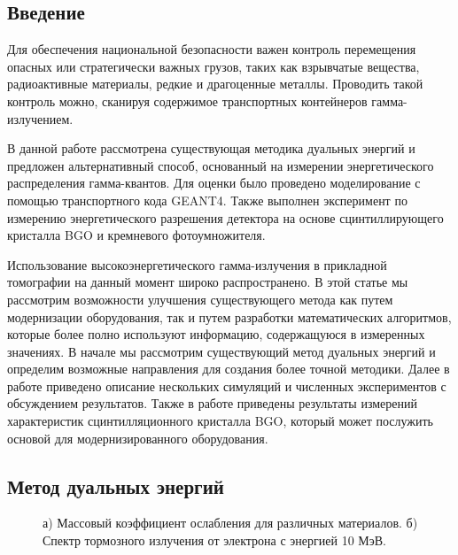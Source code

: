 
\subsection{Введение}

Для обеспечения национальной безопасности важен контроль перемещения опасных или стратегически важных грузов, таких как взрывчатые вещества, радиоактивные материалы, редкие и драгоценные металлы. Проводить такой контроль можно, сканируя содержимое транспортных контейнеров гамма-излучением.

В данной работе рассмотрена существующая методика дуальных энергий и предложен альтернативный способ, основанный на измерении энергетического распределения гамма-квантов. Для оценки было проведено моделирование с помощью транспортного кода GEANT4.  Также выполнен эксперимент по измерению энергетического разрешения детектора на основе сцинтиллирующего кристалла BGO и кремневого фотоумножителя.

Использование высокоэнергетического гамма-излучения в прикладной томографии на данный момент широко распространено.  В этой статье мы рассмотрим возможности улучшения существующего метода как путем модернизации оборудования, так и путем разработки математических алгоритмов, которые более полно используют информацию, содержащуюся в измеренных значениях. В начале мы рассмотрим существующий метод дуальных энергий и определим возможные направления для создания более точной методики. Далее в работе приведено описание нескольких симуляций и численных экспериментов с обсуждением результатов. Также в работе приведены результаты измерений характеристик сцинтилляционного кристалла BGO, который может послужить основой для модернизированного оборудования.
 
\subsection{Метод дуальных энергий}
\begin{figure}[t]
    \begin{center}
        \begin{minipage}[h]{0.49\linewidth}
        \end{minipage}
        \hfill
        \begin{minipage}[h]{0.49\linewidth}
        \end{minipage}
        \caption{а) Массовый коэффициент ослабления для различных материалов. б) Спектр тормозного излучения от электрона с энергией 10 МэВ.}
    \end{center}
    \label{pic:att}
\end{figure}

